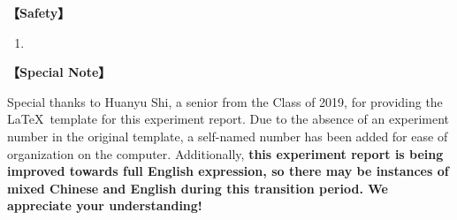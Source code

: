 \textbf{【Safety】}	
\begin{enumerate}
	\item 
\end{enumerate}	
	
	
\textbf{【Special Note】}	

Special thanks to Huanyu Shi, a senior from the Class of 2019, for providing the \LaTeX \ template for this experiment report. \textcolor{fred}{Due to the absence of an experiment number in the original template, a self-named number has been added for ease of organization on the computer.} Additionally, \textbf{this experiment report is being improved towards full English expression, so there may be instances of mixed Chinese and English during this transition period. We appreciate your understanding!}
	

\clearpage
\tableofcontents		